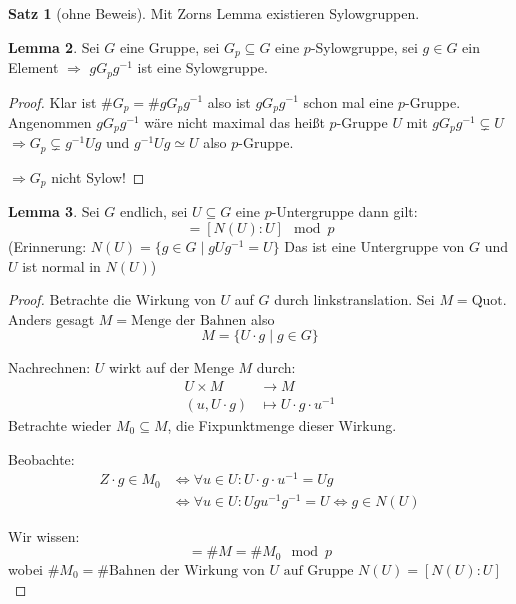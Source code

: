 \documentclass[12pt,parskip=full]{scrartcl}
\theoremstyle{definition}
\newtheorem{theorem}{Satz}[section]
\newtheorem{lemma}[theorem]{Lemma}
\theoremstyle{remark}
\begin{document}
	\begin{theorem}[ohne Beweis]
		Mit Zorns Lemma existieren Sylowgruppen.
	\end{theorem}

	\begin{lemma}
		Sei $G$ eine Gruppe, sei $G_p \subseteq G$ eine $p$-Sylowgruppe, sei $g \in G$ ein Element $\Rightarrow$ $g G_p g^{-1}$ ist eine Sylowgruppe.
	\end{lemma}

	\begin{proof}
		Klar ist $\#G_p = \# g G_p g^{-1}$ also ist $g G_p g^{-1}$ schon mal eine $p$-Gruppe.
		Angenommen $g G_p g^{-1}$ wäre nicht maximal das heißt $p$-Gruppe $U$ mit $g G_p g^{-1} \subsetneq U$ $\Rightarrow G_p \subsetneq g^{-1} U g$ und $g^{-1} U g \simeq U$ also $p$-Gruppe.
		
		$\Rightarrow G_p$ nicht Sylow!
	\end{proof}

	\begin{lemma}
		Sei $G$ endlich, sei $U \subseteq G$ eine $p$-Untergruppe dann gilt:
		\begin{equation*}
			[G:U] = [N(U): U] \mod p
		\end{equation*}
		(Erinnerung: $N(U) = \{ g \in G \mid g U g^{-1} = U \}$ Das ist eine Untergruppe von $G$ und $U$ ist normal in $N(U)$)
	\end{lemma}
	
	\begin{proof}
		Betrachte die Wirkung von $U$ auf $G$ durch linkstranslation. Sei $M = \text{Quot}$. Anders gesagt $M = \text{Menge der Bahnen}$ also
		\begin{equation*}
			M = \{ U \cdot g \mid g \in G \}
		\end{equation*}
		
		Nachrechnen: $U$ wirkt auf der Menge $M$ durch:
		\begin{align*}
			U \times M &\longrightarrow M \\
			(u, U \cdot g) &\longmapsto U \cdot g \cdot u^{-1}
		\end{align*}
		Betrachte wieder $M_0 \subseteq M$, die Fixpunktmenge dieser Wirkung.
		
		Beobachte: 
		\begin{align*}
			Z \cdot g \in M_0 &\Leftrightarrow \forall u \in U: U \cdot g \cdot u^{-1} = U g \\
			&\Leftrightarrow \forall u \in U: U g u^{-1} g^{-1} = U \Leftrightarrow g \in N(U)
		\end{align*}
		
		Wir wissen:
		\begin{equation*}
			[G:U] = \#M = \# M_0 \mod p
		\end{equation*}
		wobei $\#M_0 = \#\text{Bahnen der Wirkung von $U$ auf Gruppe $N(U)$} = [N(U):U]$
	\end{proof}
\end{document}
